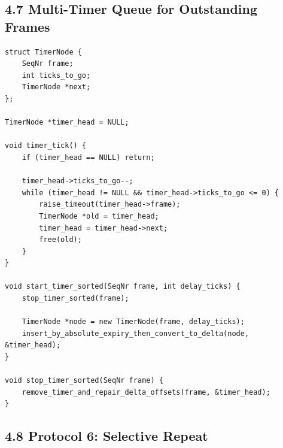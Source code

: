 \documentclass[11pt]{article}
\begin{document}
\subsection{4.7 Multi-Timer Queue for Outstanding
Frames}\label{multi-timer-queue-for-outstanding-frames}

\begin{verbatim}
struct TimerNode {
    SeqNr frame;
    int ticks_to_go;
    TimerNode *next;
};

TimerNode *timer_head = NULL;

void timer_tick() {
    if (timer_head == NULL) return;

    timer_head->ticks_to_go--;
    while (timer_head != NULL && timer_head->ticks_to_go <= 0) {
        raise_timeout(timer_head->frame);
        TimerNode *old = timer_head;
        timer_head = timer_head->next;
        free(old);
    }
}

void start_timer_sorted(SeqNr frame, int delay_ticks) {
    stop_timer_sorted(frame);

    TimerNode *node = new TimerNode(frame, delay_ticks);
    insert_by_absolute_expiry_then_convert_to_delta(node, &timer_head);
}

void stop_timer_sorted(SeqNr frame) {
    remove_timer_and_repair_delta_offsets(frame, &timer_head);
}
\end{verbatim}

\subsection{4.8 Protocol 6: Selective
Repeat}\label{protocol-6-selective-repeat}
\end{document}
